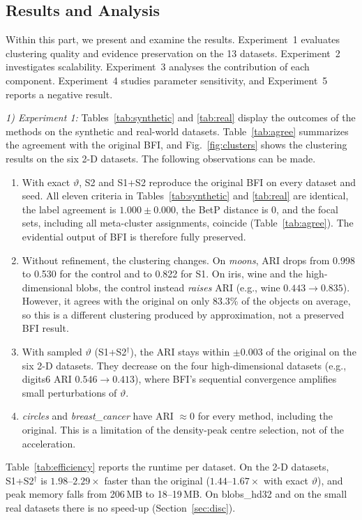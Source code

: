 \documentclass[journal]{IEEEtran}
\begin{document}
\subsection{Results and Analysis}
Within this part, we present and examine the results. Experiment~1 evaluates clustering quality and evidence preservation on the 13 datasets. Experiment~2 investigates scalability. Experiment~3 analyses the contribution of each component. Experiment~4 studies parameter sensitivity, and Experiment~5 reports a negative result.

\emph{1) Experiment 1:} Tables~\ref{tab:synthetic} and \ref{tab:real} display the outcomes of the methods on the synthetic and real-world datasets. Table~\ref{tab:agree} summarizes the agreement with the original BFI, and Fig.~\ref{fig:clusters} shows the clustering results on the six 2-D datasets. The following observations can be made.
\begin{enumerate}
\item[a)] With exact $\vartheta$, S2 and S1+S2 reproduce the original BFI on every dataset and seed. All eleven criteria in Tables~\ref{tab:synthetic} and \ref{tab:real} are identical, the label agreement is $1.000\pm0.000$, the BetP distance is $0$, and the focal sets, including all meta-cluster assignments, coincide (Table~\ref{tab:agree}). The evidential output of BFI is therefore fully preserved.
\item[b)] Without refinement, the clustering changes. On \emph{moons}, ARI drops from 0.998 to 0.530 for the control and to 0.822 for S1. On iris, wine and the high-dimensional blobs, the control instead \emph{raises} ARI (e.g., wine $0.443\rightarrow0.835$). However, it agrees with the original on only 83.3\% of the objects on average, so this is a different clustering produced by approximation, not a preserved BFI result.
\item[c)] With sampled $\vartheta$ (S1+S2$^{\dagger}$), the ARI stays within $\pm0.003$ of the original on the six 2-D datasets. They decrease on the four high-dimensional datasets (e.g., digits6 ARI $0.546\rightarrow0.413$), where BFI's sequential convergence amplifies small perturbations of $\vartheta$.
\item[d)] \emph{circles} and \emph{breast\_cancer} have ARI $\approx0$ for every method, including the original. This is a limitation of the density-peak centre selection, not of the acceleration.
\end{enumerate}

Table~\ref{tab:efficiency} reports the runtime per dataset. On the 2-D datasets, S1+S2$^{\dagger}$ is $1.98$--$2.29\times$ faster than the original ($1.44$--$1.67\times$ with exact $\vartheta$), and peak memory falls from 206\,MB to 18--19\,MB. On blobs\_hd32 and on the small real datasets there is no speed-up (Section~\ref{sec:disc}).
\end{document}
